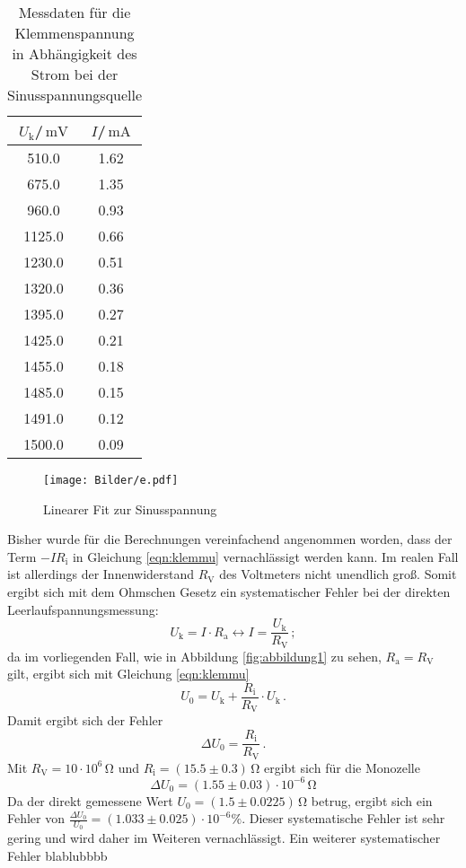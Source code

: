 \begin{table}
  \centering
  \caption{Messdaten für die Klemmenspannung in Abhängigkeit des Strom bei der Sinusspannungsquelle}
  \label{tab:sinus}

\begin{tabular}{cc}
  \toprule
$U_\text{k}$/$\,\si{\milli\volt}$ & $I$/$\,\si{\milli\ampere}$\\
\midrule
510.0 & 1.62 \\
675.0 & 1.35 \\
960.0 & 0.93 \\
1125.0 & 0.66 \\
1230.0 & 0.51 \\
1320.0 & 0.36 \\
1395.0 & 0.27 \\
1425.0 & 0.21 \\
1455.0 & 0.18 \\
1485.0 & 0.15 \\
1491.0 & 0.12 \\
1500.0 & 0.09 \\
\bottomrule
\end{tabular}
\end{table}
\begin{figure}
\texttt{[image: Bilder/e.pdf]}
\caption{Linearer Fit zur Sinusspannung}
\label{fig:plot_sinus}
\end{figure}
Bisher wurde für die Berechnungen vereinfachend angenommen worden,
dass der Term $-IR_\text{i}$ in Gleichung \eqref{eqn:klemmu} vernachlässigt werden kann. Im realen Fall ist allerdings der Innenwiderstand $R_\text{V}$ des Voltmeters nicht unendlich groß.
Somit ergibt sich mit dem Ohmschen Gesetz ein systematischer Fehler bei der direkten Leerlaufspannungsmessung:
\begin{equation*}
  U_\text{k}=I\cdot R_\text{a} \leftrightarrow I=\frac{U_\text{k}}{R_\text{V}}\, ;
\end{equation*}
da im vorliegenden Fall, wie in Abbildung \ref{fig:abbildung1} zu sehen, $R_\text{a}=R_\text{V}$ gilt, ergibt sich mit Gleichung \eqref{eqn:klemmu}
\begin{equation*}
U_\text{0}=U_\text{k}+\frac{R_\text{i}}{R_\text{V}}\cdot U_\text{k}\, .
\end{equation*}
Damit ergibt sich der Fehler
\begin{equation*}
  \Delta  U_\text{0}=\frac{R_\text{i}}{R_\text{V}} \, .
\end{equation*}
Mit $R_\text{V}=10 \cdot 10^6 \,\si{\ohm}$ und $R_\text{i}=(15.5\pm0.3)\,\si{\ohm}$ ergibt sich für die Monozelle
\begin{equation*}
\Delta U_\text{0}= (1.55 \pm 0.03)\cdot 10^{-6}\, \si{\ohm}
\end{equation*}
Da der direkt gemessene Wert $U_\text{0}=(1.5 \pm 0.0225)\, \si{\ohm}$ betrug, ergibt sich ein Fehler von $\frac{\Delta U_\text{0}}{U_\text{0}}=(1.033\pm0.025)\cdot 10^{-6} \%$.
Dieser systematische Fehler ist sehr gering und wird daher im Weiteren vernachlässigt.
Ein weiterer systematischer Fehler blablubbbb%
